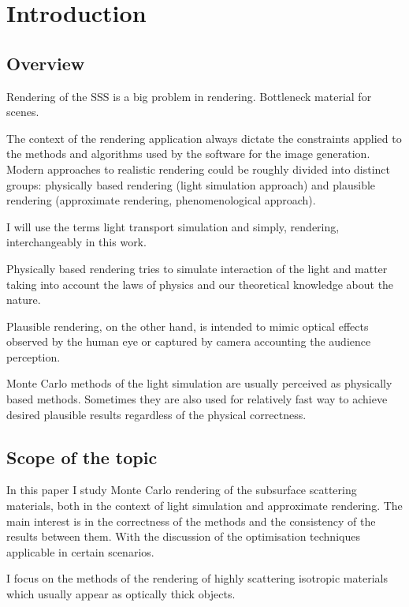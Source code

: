 \chapter{Introduction}
\label{chapter:introduction}

\section{Overview}

Rendering of the SSS is a big problem in rendering. Bottleneck material for
scenes.

The context of the rendering application always dictate the constraints
applied to the methods and algorithms used by the software for the image generation.
Modern approaches to realistic rendering could be roughly divided into distinct
groups:
physically based rendering (light simulation approach) and plausible rendering
(approximate rendering, phenomenological approach).

I will use the terms light transport simulation and simply, rendering,
interchangeably in this work.

Physically based rendering tries to simulate interaction of the light and matter
taking into account the laws of physics and our theoretical knowledge about the
nature.

Plausible rendering, on the other hand, is intended to mimic optical effects
observed by the human eye or captured by camera accounting the audience
perception.

Monte Carlo methods of the light simulation are usually perceived as
physically based methods. Sometimes they are also used for relatively fast way
to achieve desired plausible results regardless of the physical correctness.

\section{Scope of the topic}
In this paper I study Monte Carlo rendering of the subsurface scattering
materials, both in the context of light simulation and approximate rendering.
The main interest is in the correctness of the methods and the
consistency of the results between them. With the discussion of the optimisation
techniques applicable in certain scenarios.

I focus on the methods of the rendering of highly scattering isotropic materials
which usually appear as optically thick objects.

